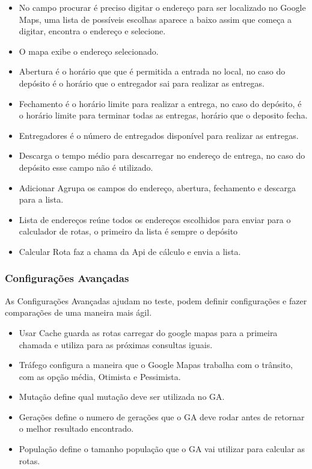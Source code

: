 \begin{itemize}
	\item No campo procurar é preciso digitar o endereço para ser localizado no Google Maps, uma lista de possíveis escolhas aparece a baixo assim que começa a digitar, encontra o endereço e selecione.
	\item O mapa exibe o endereço selecionado.
	\item Abertura é o horário que que é permitida a entrada no local, no caso do depósito é o horário que o entregador sai para realizar as entregas.
	\item Fechamento é o horário limite para realizar a entrega, no caso do depósito, é o horário limite para terminar todas as entregas, horário que o deposito fecha.
	\item Entregadores é o número de entregados disponível para realizar as entregas.
	\item Descarga o tempo médio para descarregar no endereço de entrega, no caso do depósito esse campo não é utilizado.
	\item Adicionar Agrupa os campos do endereço, abertura, fechamento e descarga para a lista.
	\item Lista de endereços reúne todos os endereços escolhidos para enviar para o calculador de rotas, o primeiro da lista é sempre o depósito
	\item Calcular Rota faz a chama da Api de cálculo e envia a lista.
\end{itemize}

\subsubsection{Configurações Avançadas}
As Configurações Avançadas ajudam no teste, podem definir configurações e fazer comparações de uma maneira mais ágil.
\begin{itemize}
	\item Usar Cache guarda as rotas carregar do google mapas para a primeira chamada e utiliza para as próximas consultas iguais.
	\item Tráfego configura a maneira que o Google Mapas trabalha com o trânsito, com as opção média, Otimista e Pessimista.
	\item Mutação define qual mutação deve ser utilizada no GA.
	\item Gerações define o numero de gerações que o GA deve rodar antes de retornar o melhor resultado encontrado.
	\item População define o tamanho população que o GA vai utilizar para calcular as rotas.
\end{itemize}

